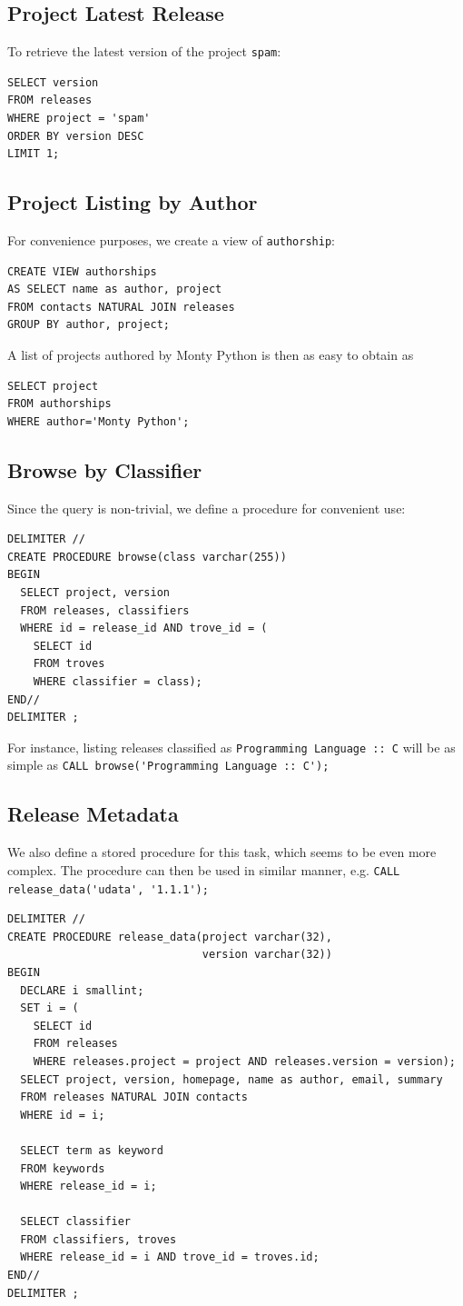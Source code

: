 \documentclass[a4paper,12pt]{article}
\begin{document}
\subsection{Project Latest Release}
To retrieve the latest version of the project \verb|spam|:
\begin{verbatim}
SELECT version
FROM releases
WHERE project = 'spam'
ORDER BY version DESC
LIMIT 1;
\end{verbatim}

\subsection{Project Listing by Author}
For convenience purposes, we create a view of \verb|authorship|:
\begin{verbatim}
CREATE VIEW authorships
AS SELECT name as author, project
FROM contacts NATURAL JOIN releases
GROUP BY author, project;
\end{verbatim}
A list of projects authored by Monty Python is then as easy to obtain as
\begin{verbatim}
SELECT project
FROM authorships
WHERE author='Monty Python';
\end{verbatim}

\subsection{Browse by Classifier}
Since the query is non-trivial, we define a procedure for convenient use:
\begin{verbatim}
DELIMITER //
CREATE PROCEDURE browse(class varchar(255))
BEGIN
  SELECT project, version
  FROM releases, classifiers
  WHERE id = release_id AND trove_id = (
    SELECT id
    FROM troves
    WHERE classifier = class);
END//
DELIMITER ;
\end{verbatim}
For instance, listing releases classified as
\verb|Programming Language :: C| will be as simple as
\verb|CALL browse('Programming Language :: C');|

\subsection{Release Metadata}
We also define a stored procedure for this task, which seems to be even
more complex.  The procedure can then be used in similar manner,
e.g. \verb|CALL release_data('udata', '1.1.1');|
\begin{verbatim}
DELIMITER //
CREATE PROCEDURE release_data(project varchar(32),
                              version varchar(32))
BEGIN
  DECLARE i smallint;
  SET i = (
    SELECT id
    FROM releases
    WHERE releases.project = project AND releases.version = version);
  SELECT project, version, homepage, name as author, email, summary
  FROM releases NATURAL JOIN contacts
  WHERE id = i;

  SELECT term as keyword
  FROM keywords
  WHERE release_id = i;

  SELECT classifier
  FROM classifiers, troves
  WHERE release_id = i AND trove_id = troves.id;
END//
DELIMITER ;
\end{verbatim}
\end{document}
